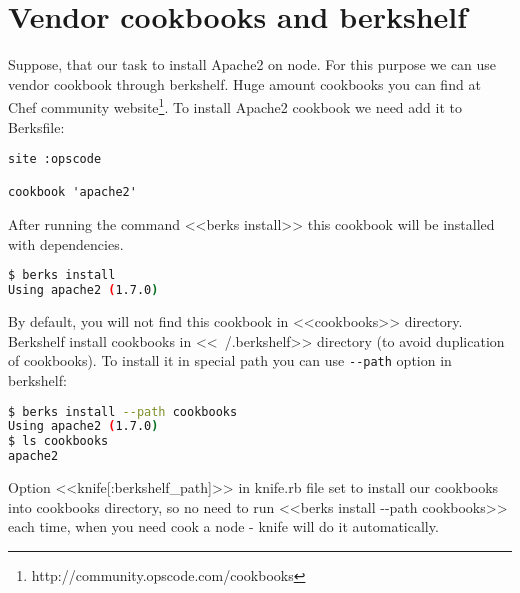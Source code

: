 \section{Vendor cookbooks and berkshelf}

Suppose, that our task to install Apache2 on node. For this purpose we can use vendor cookbook through berkshelf. Huge amount cookbooks you can find at Chef community website\footnote{http://community.opscode.com/cookbooks}. To install Apache2 cookbook we need add it to Berksfile:

\begin{lstlisting}[label=lst:my-cloud-berkshelf1,title=my-cloud/Berksfile]
site :opscode

cookbook 'apache2'
\end{lstlisting}

After running the command <<berks install>> this cookbook will be installed with dependencies.

\begin{lstlisting}[language=Bash,label=lst:my-cloud-berkshelf2,title=my-cloud/Berksfile]
$ berks install
Using apache2 (1.7.0)
\end{lstlisting}

By default, you will not find this cookbook in <<cookbooks>> directory. Berkshelf install cookbooks in <<~/.berkshelf>> directory (to avoid duplication of cookbooks). To install it in special path you can use \texttt{-\--path} option in berkshelf:

\begin{lstlisting}[language=Bash,label=lst:my-cloud-berkshelf3,title=my-cloud/Berksfile]
$ berks install --path cookbooks
Using apache2 (1.7.0)
$ ls cookbooks
apache2
\end{lstlisting}

Option <<knife[:berkshelf\_path]>> in knife.rb file set to install our cookbooks into cookbooks directory, so no need to run <<berks install -\--path cookbooks>> each time, when you need cook a node - knife will do it automatically.



